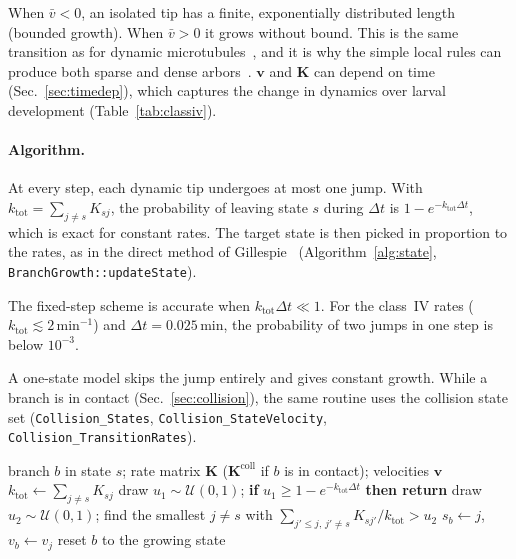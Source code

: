 \documentclass[11pt,a4paper]{article}
\newcommand{\code}[1]{\texttt{#1}}
\newcommand{\vect}[1]{\bm{#1}}
\begin{document}
When $\bar v<0$, an isolated tip has a finite, exponentially distributed length (bounded growth). When $\bar v>0$ it grows without bound. This is the same transition as for dynamic microtubules~\cite{Dogterom1993}, and it is why the simple local rules can produce both sparse and dense arbors~\cite{Shree2022,Ouyang2025}. $\vect v$ and $\mathbf K$ can depend on time (Sec.~\ref{sec:timedep}), which captures the change in dynamics over larval development (Table~\ref{tab:classiv}).

\paragraph{Algorithm.}
At every step, each dynamic tip undergoes at most one jump. With $k_\text{tot}=\sum_{j\neq s}K_{sj}$, the probability of leaving state $s$ during $\Delta t$ is $1-e^{-k_\text{tot}\Delta t}$, which is exact for constant rates. The target state is then picked in proportion to the rates, as in the direct method of Gillespie~\cite{Gillespie1977} (Algorithm~\ref{alg:state}, \code{BranchGrowth::updateState}).

The fixed-step scheme is accurate when $k_\text{tot}\Delta t\ll 1$. For the class~IV rates ($k_\text{tot}\lesssim 2\,\text{min}^{-1}$) and $\Delta t=0.025$\,min, the probability of two jumps in one step is below $10^{-3}$.

A one-state model skips the jump entirely and gives constant growth. While a branch is in contact (Sec.~\ref{sec:collision}), the same routine uses the collision state set (\code{Collision\_States}, \code{Collision\_StateVelocity}, \code{Collision\_TransitionRates}).

\begin{algorithm}[!htbp]
\caption{Markov state update of a tip (\code{BranchGrowth::updateState})}\label{alg:state}
\begin{algorithmic}[1]
\Require branch $b$ in state $s$; rate matrix $\mathbf K$ ($\mathbf K^\text{coll}$ if $b$ is in contact); velocities $\vect v$
\State $k_\text{tot}\gets\sum_{j\ne s}K_{sj}$
\State draw $u_1\sim\mathcal U(0,1)$; \textbf{if} $u_1\ge 1-e^{-k_\text{tot}\Delta t}$ \textbf{then return} 
\State draw $u_2\sim\mathcal U(0,1)$; find the smallest $j\neq s$ with $\sum_{j'\le j,\,j'\ne s}K_{sj'}/k_\text{tot}>u_2$
\State $s_b\gets j$, \; $v_b\gets v_j$
 reset $b$ to the growing state  \EndIf
\end{algorithmic}
\end{algorithm}
\end{document}
